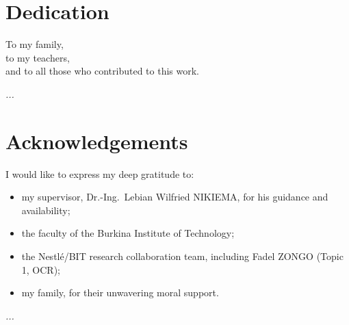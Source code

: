 \documentclass[12pt]{report}
\newcommand{\todo}[1]{\textsl{\colorbox[rgb]{1,1,0}{#1}}}
\begin{document}
\section*{Dedication}
\setcounter{page}{2}
\thispagestyle{fancy}
\vspace{2cm}
\begin{center}
To my family,\\
to my teachers,\\
and to all those who contributed to this work.
\end{center}
\todo{ ...}
\newpage
{}
\section*{Acknowledgements}
I would like to express my deep gratitude to:
\begin{itemize}
    \item my supervisor, Dr.-Ing.\ Lebian Wilfried NIKIEMA, for his guidance and availability;
    \item the faculty of the Burkina Institute of Technology;
    \item the Nestl\'e/BIT research collaboration team, including Fadel ZONGO (Topic 1, OCR);
    \item my family, for their unwavering moral support.
\end{itemize}
\todo{ ...}
\thispagestyle{fancy}
\newpage
{}
\end{document}

